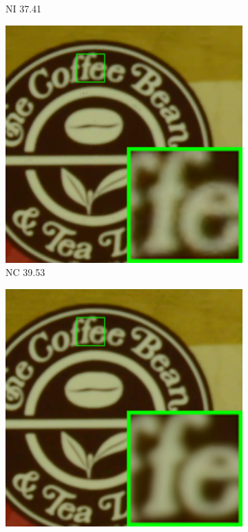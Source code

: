 \begin{figure}
\begin{subfigure}[t]{0.19\textwidth}
		\caption{NI 37.41}
    \end{subfigure}
    \hfill
    \begin{subfigure}[t]{0.19\textwidth}
        \centering
        \includegraphics[width=1\textwidth]{images/guided/cc60/resize_br_NC_CC_Noisy_Nikon_D800_ISO_1600_B2_109.png}
\caption{NC 39.53}
    \end{subfigure}
    \hfill
    \begin{subfigure}[t]{0.19\textwidth}
        \centering
        \includegraphics[width=1\textwidth]{images/guided/cc60/resize_br_Guided_CC_Noisy_Nikon_D800_ISO_1600_B2_109.png}

\end{subfigure}
\end{figure}
